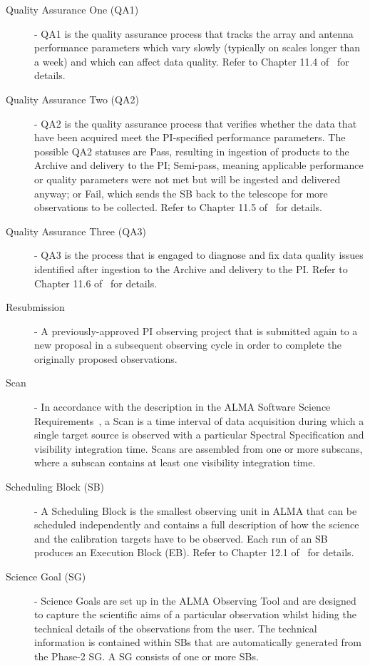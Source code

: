 \begin{description}
\item[Quality Assurance One (QA1)] - QA1 is the quality assurance process that tracks the array and antenna performance parameters which vary slowly (typically on scales longer than a week) and which can affect data quality. Refer to Chapter 11.4 of~\cite{c10_thb} for details. 
\item[Quality Assurance Two (QA2)] - QA2 is the quality assurance process that verifies whether the data that have been acquired meet the PI-specified performance parameters. The possible QA2 statuses are Pass, resulting in ingestion of products to the Archive and delivery to the PI; Semi-pass, meaning applicable performance or quality parameters were not met but will be ingested and delivered anyway; or Fail, which sends the SB back to the telescope for more observations to be collected. Refer to Chapter 11.5 of~\cite{c10_thb} for details.
\item[Quality Assurance Three (QA3)] -  QA3 is the process that is engaged to diagnose and fix data quality issues identified after ingestion to the Archive and delivery to the PI.  Refer to Chapter 11.6 of~\cite{c10_thb} for details. 
\item[Resubmission] - A previously-approved PI observing project that is submitted again to a new proposal in a subsequent observing cycle in order to complete the originally proposed observations.
\item[Scan] - In accordance with the description in the ALMA Software Science Requirements~\cite{SSRdoc}, a Scan is a time interval of data acquisition during which a single target source is observed with a particular Spectral Specification and visibility integration time. Scans are assembled from one or more subscans, where a subscan contains at least one visibility integration time.
\item[Scheduling Block (SB)] - A Scheduling Block is the smallest observing unit in ALMA that can be scheduled independently and contains a full description of how the science and the calibration targets have to be observed. Each run of an SB produces an Execution Block (EB). Refer to Chapter 12.1 of~\cite{c10_thb} for details.
\item[Science Goal (SG)] -  Science Goals are set up in the ALMA Observing Tool and are designed to capture the scientific aims of a particular observation whilst hiding the technical details of the observations from the user. The technical information is contained within SBs that are automatically generated from the Phase-2 SG. A SG consists of one or more SBs.

\end{description}
